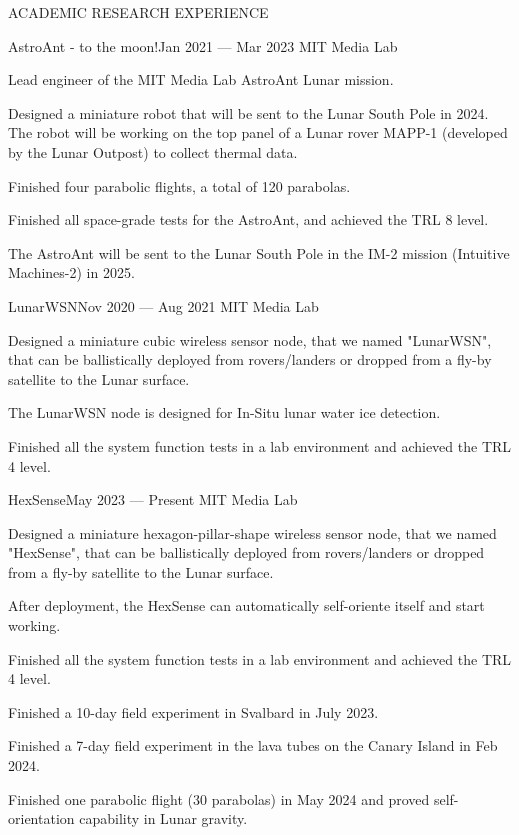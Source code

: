 \documentclass{resume} %
\begin{document}
\begin{rSection}{ACADEMIC RESEARCH EXPERIENCE}
\begin{rSubsection}{AstroAnt - to the moon!}{Jan 2021 --- Mar 2023}{ }{MIT Media Lab}
    \item Lead engineer of the MIT Media Lab AstroAnt Lunar mission.
    \item Designed a miniature robot that will be sent to the Lunar South Pole in 2024.
          The robot will be working on the top panel of a Lunar rover MAPP-1 (developed by the Lunar Outpost)
          to collect thermal data.
    \item Finished four parabolic flights, a total of 120 parabolas.
    \item Finished all space-grade tests for the AstroAnt, and achieved the TRL 8 level.
    \item The AstroAnt will be sent to the Lunar South Pole in the IM-2 mission (Intuitive Machines-2) in 2025.
\end{rSubsection}

\begin{rSubsection}{LunarWSN}{Nov 2020 --- Aug 2021}{ }{MIT Media Lab}
\item Designed a miniature cubic wireless sensor node, that we named "LunarWSN",
      that can be ballistically deployed from rovers/landers or dropped from a fly-by satellite to the Lunar surface.
\item The LunarWSN node is designed for In-Situ lunar water ice detection.
\item Finished all the system function tests in a lab environment and achieved the TRL 4 level.
\end{rSubsection}

\newpage

\begin{rSubsection}{HexSense}{May 2023 --- Present}{ }{MIT Media Lab}
\item Designed a miniature hexagon-pillar-shape wireless sensor node, that we named "HexSense",
      that can be ballistically deployed from rovers/landers or dropped from a fly-by satellite to the Lunar surface.
\item After deployment, the HexSense can automatically self-oriente itself and start working.
\item Finished all the system function tests in a lab environment and achieved the TRL 4 level.
\item Finished a 10-day field experiment in Svalbard in July 2023.
\item Finished a 7-day field experiment in the lava tubes on the Canary Island in Feb 2024.
\item Finished one parabolic flight (30 parabolas) in May 2024 and proved self-orientation capability in Lunar gravity.
\end{rSubsection}


\end{rSection}
\end{document}
